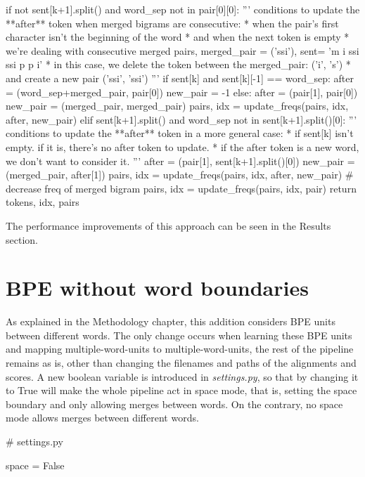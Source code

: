 \begin{python}
      if not sent[k+1].split() and word_sep not in pair[0][0]:
        '''
        conditions to update the **after** token when merged bigrams are consecutive:
        * when the pair's first character isn't the beginning of the word
        * and when the next token is empty
        * we're dealing with consecutive merged pairs, merged_pair = ('ssi'), sent= 'm i ssi ssi p p i'
            * in this case, we delete the token between the merged_pair: ('i', 's')
            * and create a new pair ('ssi', 'ssi')
        '''
        if sent[k] and sent[k][-1] == word_sep:
          after = (word_sep+merged_pair, pair[0])
          new_pair = -1
        else:
          after = (pair[1], pair[0])
          new_pair = (merged_pair, merged_pair)
          pairs, idx = update_freqs(pairs, idx, after, new_pair)
      elif sent[k+1].split() and word_sep not in sent[k+1].split()[0]:
        '''
        conditions to update the **after** token in a more general case:
        * if sent[k] isn't empty. if it is, there's no after token to update.
        * if the after token is a new word, we don't want to consider it.
        '''
        after = (pair[1], sent[k+1].split()[0])
        new_pair = (merged_pair, after[1])
        pairs, idx = update_freqs(pairs, idx, after, new_pair)
      # decrease freq of merged bigram
      pairs, idx = update_freqs(pairs, idx, pair)
  return tokens, idx, pairs
\end{python}

The performance improvements of this approach can be seen in the Results section.

\section{BPE without word boundaries}

As explained in the Methodology chapter, this addition considers BPE units between different words. The only change occurs when learning these BPE units and mapping multiple-word-units to multiple-word-units, the rest of the pipeline remains as is, other than changing the filenames and paths of the alignments and scores. A new boolean variable is introduced in \emph{settings.py}, so that by changing it to True will make the whole pipeline act in space mode, that is, setting the space boundary and only allowing merges between words. On the contrary, no space mode allows merges between different words.

\begin{python}
# settings.py

space = False
\end{python}

